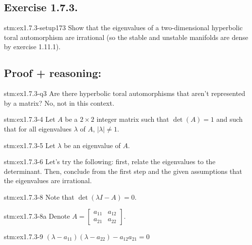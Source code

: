 \subsection*{Exercise 1.7.3.}

\begin{exercise}{stm:ex1.7.3-setup173}
Show that the eigenvalues of a two-dimensional hyperbolic toral automorphism are irrational (so the stable and unstable manifolds are dense by exercise 1.11.1).
\end{exercise}

\subsection*{Proof {\color{blue} + reasoning}:}

\begin{explanation}{stm:ex1.7.3-q3}
Are there hyperbolic toral automorphisms that aren't represented by a matrix? No, not in this context.
\end{explanation}

\begin{statement}{stm:ex1.7.3-4}
Let $A$ be a $2 \times 2$ integer matrix such that $\det(A) = 1$ and such that for all eigenvalues $\lambda$ of $A$, $|\lambda| \neq 1$.
\end{statement}

\begin{statement}{stm:ex1.7.3-5}
Let $\lambda$ be an eigenvalue of $A$.
\end{statement}

\begin{explanation}{stm:ex1.7.3-6}
Let's try the following: first, relate the eigenvalues to the determinant. Then, conclude from the first step and the given assumptions that the eigenvalues are irrational.
\end{explanation}

\begin{statement}{stm:ex1.7.3-8}
Note that $\det(\lambda I - A) = 0$.
\end{statement}

\begin{statement}{stm:ex1.7.3-8a}
Denote $A = \begin{bmatrix} a_{11} & a_{12} \\ a_{21} & a_{22} \end{bmatrix}$.
\end{statement}

\begin{statement}{stm:ex1.7.3-9}
$(\lambda - a_{11})(\lambda - a_{22}) - a_{12}a_{21} = 0$
\end{statement}

